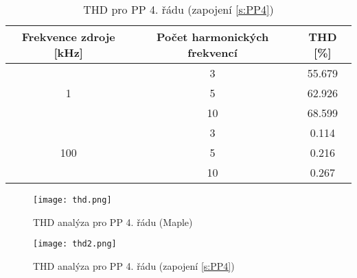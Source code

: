 \begin{table}[h]
\centering
\renewcommand{\arraystretch}{1.15}
  \begin{tabular}{ | c | c | c |} 
    \hline
     Frekvence zdroje [kHz] & Počet harmonických frekvencí & THD [\%] \\ \hline
    \multirow{3}{*}{1} & 3 & 55.679 \\& 5 & 62.926 \\& 10 & 68.599 \\ \hline
	\multirow{3}{*}{100} & 3 & 0.114\\& 5 & 0.216 \\& 10 & 0.267 \\ \hline
  \end{tabular}
  \caption[THD pro PP 4. řádu]{THD pro PP 4. řádu (zapojení \ref{s:PP4}) \label{s:THD4}}
\end{table}
\begin{figure}[h]
\centering
\texttt{[image: thd.png]}
\caption[THD analýza pro PP 4. řádu (Maple)]{THD analýza pro PP 4. řádu (Maple)}
\end{figure}
\begin{figure}[h]
\centering
\texttt{[image: thd2.png]}
\caption[THD analýza pro PP 4. řádu (zapojení \ref{s:PP4})]{THD analýza pro PP 4. řádu (zapojení \ref{s:PP4})}
\end{figure}